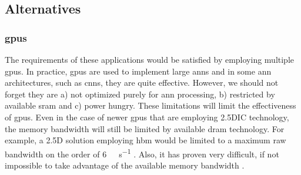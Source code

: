 \iffalse
So the question becomes, can a system employ \ac{dram} with minimal \ac{sram} and still meet the system requirements?
\fi

\iffalse
We believe a system can be designed with \ac{dram} as the primary processing store. This will require careful use of data structures to describe storage within \ac{dram} to ensure we make good use of the potential bandwidth. But there are other benefits we will take advantage of, but more about that later.
\fi

\iffalse
There important application is disparate \ac{ann}s because specifically a form of \ac{dnn}, Convolutional Neural networks (\ac{cnn}) have gotten good press recently, but they are not the only \ac{dnn}.
\fi



\iffalse
So considering the performance improvements observed in other applications, it is expected that many customer facing or embedded applications will implement multiple instances of artificial neural networks to perform various functions.
have very large memory and processing requirements.
require multiple instances of \ac{ann}s of similar size to the \ac{ann} described in \cite{krizhevsky2012imagenet}.

For example employing multiple cameras or monitoring and controlling different systems in a drone, a automobile each with an image recognition \ac{ann}\cite{krizhevsky2012imagenet}\cite{bojarski2016end} for navigation, engine monitoring along with other system control.
\fi

\subsection{Alternatives}
\label{sec:Alternatives}

\subsubsection{\Acfp{gpu}}
\label{sec:gpu}
The requirements of these applications would be satisfied by employing multiple \acp{gpu}.
In practice, \acp{gpu} are used to implement large \ac{ann}s and in some \ac{ann} architectures, such as \acp{cnn}, they are quite effective. However, we should not forget they are a) not optimized purely for \ac{ann} processing, b) restricted by available \ac{sram} and c) power hungry. 
These limitations will limit the effectiveness of \acp{gpu}.
Even in the case of newer \acp{gpu} that are employing 2.5DIC technology, the memory bandwidth will still be limited by available \ac{dram} technology.
For example, a 2.5D solution employing \ac{hbm} would be limited to a maximum raw bandwidth on the order of \SI[per-mode=symbol]{6}{\tera \bit \per \second} \cite{Nvidia_p100_summary_datasheet}.
Also, it has proven very difficult, if not impossible to take advantage of the available memory bandwidth \cite{farabet2011neuflow} \cite{jouppi2017datacenter}.


